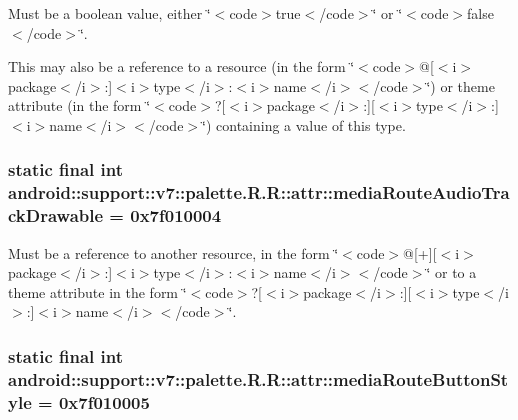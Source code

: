 Must be a boolean value, either \char`\"{}$<$code$>$true$<$/code$>$\char`\"{} or \char`\"{}$<$code$>$false$<$/code$>$\char`\"{}. 

This may also be a reference to a resource (in the form \char`\"{}$<$code$>$@\mbox{[}$<$i$>$package$<$/i$>$:\mbox{]}$<$i$>$type$<$/i$>$:$<$i$>$name$<$/i$>$$<$/code$>$\char`\"{}) or theme attribute (in the form \char`\"{}$<$code$>$?\mbox{[}$<$i$>$package$<$/i$>$:\mbox{]}\mbox{[}$<$i$>$type$<$/i$>$:\mbox{]}$<$i$>$name$<$/i$>$$<$/code$>$\char`\"{}) containing a value of this type. \hypertarget{classandroid_1_1support_1_1v7_1_1palette_1_1_r_1_1attr_bbca36058059900c01fbab873ab51af3}{
\subsubsection[{mediaRouteAudioTrackDrawable}]{\setlength{\rightskip}{0pt plus 5cm}static final int android::support::v7::palette.R.R::attr::mediaRouteAudioTrackDrawable = 0x7f010004}}
\label{classandroid_1_1support_1_1v7_1_1palette_1_1_r_1_1attr_bbca36058059900c01fbab873ab51af3}


Must be a reference to another resource, in the form \char`\"{}$<$code$>$@\mbox{[}+\mbox{]}\mbox{[}$<$i$>$package$<$/i$>$:\mbox{]}$<$i$>$type$<$/i$>$:$<$i$>$name$<$/i$>$$<$/code$>$\char`\"{} or to a theme attribute in the form \char`\"{}$<$code$>$?\mbox{[}$<$i$>$package$<$/i$>$:\mbox{]}\mbox{[}$<$i$>$type$<$/i$>$:\mbox{]}$<$i$>$name$<$/i$>$$<$/code$>$\char`\"{}. \hypertarget{classandroid_1_1support_1_1v7_1_1palette_1_1_r_1_1attr_3835d4c2d9aa8f8b5a77a940f3019ff4}{
\subsubsection[{mediaRouteButtonStyle}]{\setlength{\rightskip}{0pt plus 5cm}static final int android::support::v7::palette.R.R::attr::mediaRouteButtonStyle = 0x7f010005}}
\label{classandroid_1_1support_1_1v7_1_1palette_1_1_r_1_1attr_3835d4c2d9aa8f8b5a77a940f3019ff4}


